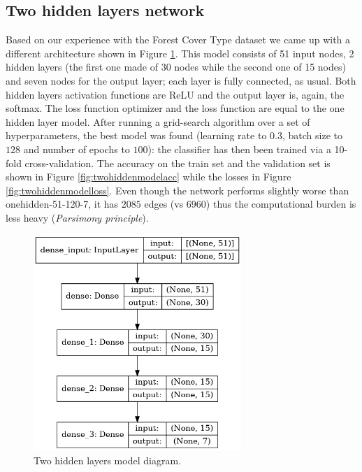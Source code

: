 \subsection{Two hidden layers network}
\label{sec:twohidden}
Based on our experience with the Forest Cover Type dataset we came up with a different architecture shown in Figure \ref{fig:twohiddenmodel}. This model consists of 51 input nodes, 2 hidden layers (the first one made of 30 nodes while the second one of 15 nodes) and seven nodes for the output layer; each layer is fully connected, as usual. Both hidden layers activation functions are ReLU and the output layer is, again, the softmax. The loss function optimizer and the loss function are equal to the one hidden layer model.
After running a grid-search algorithm over a set of hyperparameters, the best model was found (learning rate to $0.3$, batch size to $128$ and number of epochs to $100$): the classifier has then been trained via a 10-fold cross-validation. The accuracy on the train set and the validation set is shown in Figure \ref{fig:twohiddenmodelacc} while the losses in Figure \ref{fig:twohiddenmodelloss}. Even though the network performs slightly worse than onehidden-51-120-7, it has $2085$ edges (vs $6960$) thus the computational burden is less heavy (\textit{Parsimony principle}\cite{gori}).
\begin{figure}
\centering
\includegraphics[width=0.7\textwidth]{./TeX_files/img/twohiddenmodel.png}
\caption{Two hidden layers model diagram.}
\label{fig:twohiddenmodel}
\end{figure}

